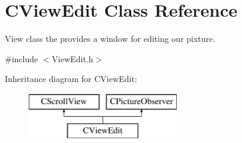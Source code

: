 \hypertarget{class_c_view_edit}{\section{C\+View\+Edit Class Reference}
\label{class_c_view_edit}
}


View class the provides a window for editing our pixture.  




{\ttfamily \#include $<$View\+Edit.\+h$>$}

Inheritance diagram for C\+View\+Edit\+:\begin{figure}[H]
\begin{center}
\leavevmode
\includegraphics[height=2.000000cm]{class_c_view_edit}
\end{center}
\end{figure}
